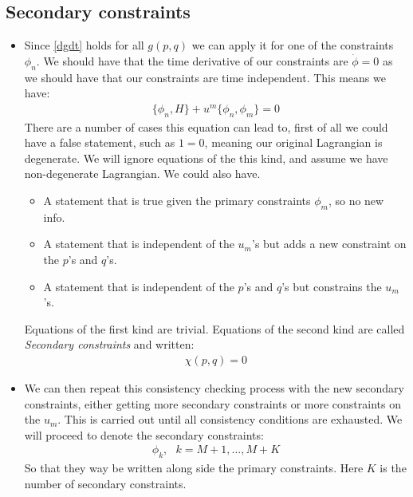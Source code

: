\documentclass[11pt]{article}
\numberwithin{equation}{section}
\begin{document}
   \subsection{Secondary constraints}
   \begin{itemize}
     \item Since \ref{dgdt} holds for all $g(p,q)$ we can apply it for one of the constraints $\phi_n$. We should have that the time derivative of our constraints are $\dot{\phi}=0$ as we should have that our constraints are time independent. This means we have:
     \begin{align}
     \label{consistency}
       \{\phi_n,H\} +u^{m}\{\phi_n,\phi_m\} =0 
     \end{align}
     There are a number of cases this equation can lead to, first of all we could have a false statement, such as $1=0$, meaning our original Lagrangian is degenerate. We will ignore equations of the this kind, and assume we have non-degenerate Lagrangian. We could also have.
     \begin{itemize}
        \item A statement that is true given the primary constraints $\phi_m$, so no new info.
        \item A statement that is independent of the $u_m$'s but adds a new constraint on the $p$'s and $q$'s. 
        \item A statement that is independent of the $p$'s and $q$'s but constrains the $u_m$'s. 
      \end{itemize} 
       Equations of the first kind are trivial. Equations of the second kind are called \emph{Secondary constraints} and written:
       \begin{align*}
         \chi(p,q)=0
       \end{align*}
       \item We can then repeat this consistency checking process with the new secondary constraints, either getting more secondary constraints or more constraints on the $u_m$. This is carried out until all consistency conditions are exhausted. We will proceed to denote the secondary constraints:
       \begin{align*}
            \phi_k,~~~k=M+1,\ldots,M+K
          \end{align*}   
          So that they way be written along side the primary constraints. Here $K$ is the number of secondary constraints. 
   \end{itemize}
\end{document}

